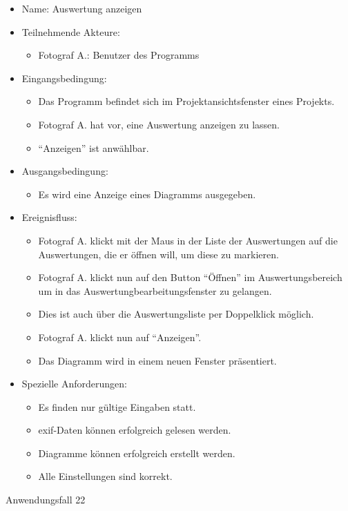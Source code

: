 \begin{itemize}
\item Name: Auswertung anzeigen 
\item Teilnehmende Akteure:
\begin{itemize}
\item Fotograf A.: Benutzer des Programms
\end{itemize}
\item Eingangsbedingung:
\begin{itemize}
\item Das Programm befindet sich im Projektansichtsfenster eines Projekts.
\item Fotograf A. hat vor, eine Auswertung anzeigen zu lassen.
\item "`Anzeigen"' ist anwählbar.
\end{itemize}
\item Ausgangsbedingung:
\begin{itemize}
\item Es wird eine Anzeige eines Diagramms ausgegeben.
\end{itemize}
\item Ereignisfluss:
\begin{itemize}
\item Fotograf A. klickt mit der Maus in der Liste der Auswertungen auf die Auswertungen, die er öffnen will, um diese zu markieren.
\item Fotograf A. klickt nun auf den Button "`Öffnen"' im Auswertungsbereich um in das Auswertungbearbeitungsfenster zu gelangen.
\item Dies ist auch über die Auswertungsliste per Doppelklick möglich.
\item Fotograf A. klickt nun auf "`Anzeigen"'.
\item Das Diagramm wird in einem neuen Fenster präsentiert.
\end{itemize}
\item Spezielle Anforderungen:
\begin{itemize}
\item Es finden nur gültige Eingaben statt.
\item \gls{exif}-Daten können erfolgreich gelesen werden.
\item Diagramme können erfolgreich erstellt werden.
\item Alle Einstellungen sind korrekt.
\end{itemize}
\end{itemize}
 
\begin{description}
\item[Anwendungsfall 22]
\end{description}
 
